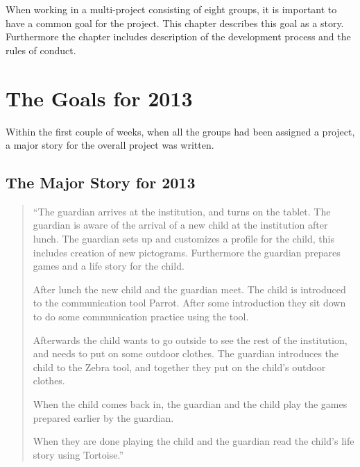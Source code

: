 When working in a multi-project consisting of eight groups, it is important to have a common goal for the project. This chapter describes this goal as a story. Furthermore the chapter includes description of the development process and the rules of conduct.  %

\section{The Goals for 2013}
Within the first couple of weeks, when all the groups had been assigned a project, a major story for the overall project was written.

\subsection*{The Major Story for 2013}
\begin{quote}
``The guardian arrives at the institution, and turns on the tablet. The guardian is aware of the arrival of a new child at the institution after lunch.
The guardian sets up and customizes a profile for the child, this includes creation of new pictograms. Furthermore the guardian prepares games and a life story for the child.

After lunch the new child and the guardian meet. The child is introduced to the communication tool Parrot. After some introduction they sit down to do some communication practice using the tool.

Afterwards the child wants to go outside to see the rest of the institution, and needs to put on some outdoor clothes. The guardian introduces the child to the Zebra tool, and together they put on the child's outdoor clothes.

When the child comes back in, the guardian and the child play the games prepared earlier by the guardian.

When they are done playing the child and the guardian read the child's life story using Tortoise.''
\end{quote}
